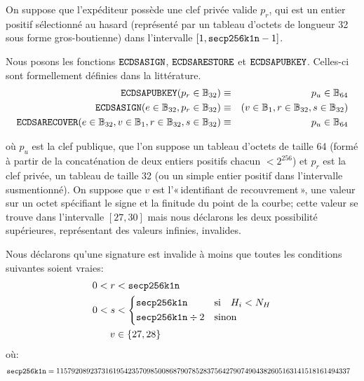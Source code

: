 \documentclass[9pt,oneside]{amsart}
\newcommand{\firsthomesteadblock}{\ensuremath{N_H}}
\begin{document}
On suppose que l'expéditeur possède une clef privée valide $p_r$, qui est un entier positif sélectionné au hasard (représenté par un tableau d'octets de longueur 32 sous forme gros-boutienne) dans l'intervalle \hbox{$[1, \mathtt{\tiny secp256k1n} - 1]$}.

Nous posons les fonctions $\mathtt{\small ECDSASIGN}$, $\mathtt{\small ECDSARESTORE}$ et $\mathtt{\small ECDSAPUBKEY}$. Celles-ci sont formellement définies dans la littérature.
\begin{eqnarray}
\mathtt{\small ECDSAPUBKEY}(p_r \in \mathbb{B}_{32}) & \equiv & p_u \in \mathbb{B}_{64} \\
\mathtt{\small ECDSASIGN}(e \in \mathbb{B}_{32}, p_r \in \mathbb{B}_{32}) & \equiv & (v \in \mathbb{B}_{1}, r \in \mathbb{B}_{32}, s \in \mathbb{B}_{32}) \\
\mathtt{\small ECDSARECOVER}(e \in \mathbb{B}_{32}, v \in \mathbb{B}_{1}, r \in \mathbb{B}_{32}, s \in \mathbb{B}_{32}) & \equiv & p_u \in \mathbb{B}_{64}
\end{eqnarray}

où $p_u$ est la clef publique, que l'on suppose un tableau d'octets de taille 64 (formé à partir de la concaténation de deux entiers positifs chacun $< 2^{256}$) et $p_r$ est la clef privée, un tableau de taille 32 (ou un simple entier positif dans l'intervalle susmentionné). On suppose que $v$ est l'«\,identifiant de recouvrement\,», une valeur sur un octet spécifiant le signe et la finitude du point de la courbe; cette valeur se trouve dans l'intervalle $[27, 30]$ mais nous déclarons les deux possibilité supérieures, représentant des valeurs infinies, invalides.

\newcommand{\slimit}{\ensuremath{\text{s-limit}}}

Nous déclarons qu'une signature est invalide à moins que toutes les conditions suivantes soient vraies:
\begin{align}
0 < r &< \mathtt{\tiny secp256k1n} \\
0 < s &< \begin{dcases}
\mathtt{\tiny secp256k1n} & \text{si} \quad H_i < \firsthomesteadblock \\
\mathtt{\tiny secp256k1n} \div 2 & \text{sinon} \\
\end{dcases} \\
 v &\in \{27,28\}
\end{align}
où:
\begin{align}
\mathtt{\tiny secp256k1n} &= 115792089237316195423570985008687907852837564279074904382605163141518161494337
\end{align}
\end{document}
